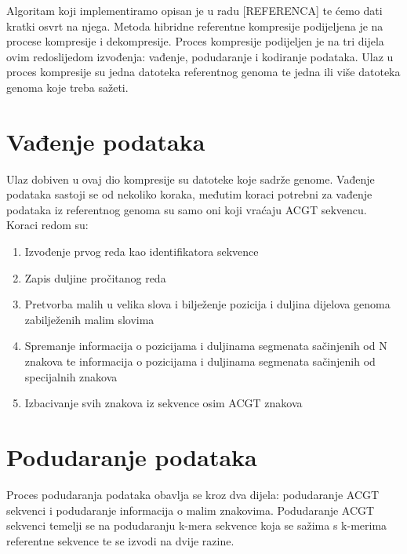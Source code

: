 Algoritam koji implementiramo opisan je u radu [REFERENCA] te ćemo dati kratki osvrt na njega. Metoda hibridne referentne kompresije podijeljena je na procese kompresije i dekompresije. Proces kompresije podijeljen je na tri dijela ovim redoslijedom izvođenja: vađenje, podudaranje i kodiranje podataka. Ulaz u proces kompresije su jedna datoteka referentnog genoma te jedna ili više datoteka genoma koje treba sažeti. 

\section{Vađenje podataka}
Ulaz dobiven u ovaj dio kompresije su datoteke koje sadrže genome. Vađenje podataka sastoji se od nekoliko koraka, međutim koraci potrebni za vađenje podataka iz referentnog genoma su samo oni koji vraćaju ACGT sekvencu. Koraci redom su:
\begin{enumerate}[label=(\roman*)]
 \item Izvođenje prvog reda kao identifikatora sekvence
 \item Zapis duljine pročitanog reda
 \item Pretvorba malih u velika slova i bilježenje pozicija i duljina dijelova genoma zabilježenih malim slovima
 \item Spremanje informacija o pozicijama i duljinama segmenata sačinjenih od N znakova te informacija o pozicijama i duljinama segmenata sačinjenih od specijalnih znakova
 \item Izbacivanje svih znakova iz sekvence osim ACGT znakova
\end{enumerate}
 
\section{Podudaranje podataka}
Proces podudaranja podataka obavlja se kroz dva dijela: podudaranje ACGT sekvenci i podudaranje informacija o malim znakovima. Podudaranje ACGT sekvenci temelji se na podudaranju k-mera sekvence koja se sažima s k-merima referentne sekvence te se izvodi na dvije razine.

